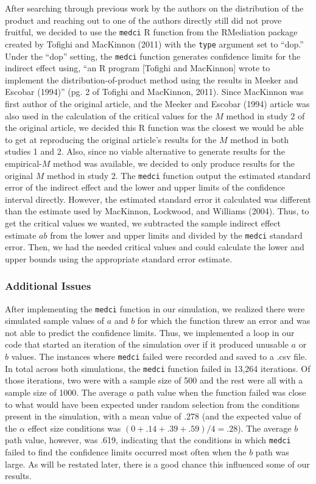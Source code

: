 \documentclass[10,a4paperpaper,]{article}
\begin{document}
After searching through previous work by the authors on the distribution
of the product and reaching out to one of the authors directly still did
not prove fruitful, we decided to use the \texttt{medci} R function from
the RMediation package created by Tofighi and MacKinnon (2011) with the
\texttt{type} argument set to ``dop.'' Under the ``dop'' setting, the
\texttt{medci} function generates confidence limits for the indirect
effect using, ``an R program {[}Tofighi and MacKinnon{]} wrote to
implement the distribution-of-product method using the results in Meeker
and Escobar (1994)'' (pg. 2 of Tofighi and MacKinnon, 2011). Since
MacKinnon was first author of the original article, and the Meeker and
Escobar (1994) article was also used in the calculation of the critical
values for the \(M\) method in study 2 of the original article, we
decided this R function was the closest we would be able to get at
reproducing the original article's results for the \(M\) method in both
studies 1 and 2. Also, since no viable alternative to generate results
for the empirical-\(M\) method was available, we decided to only produce
results for the original \(M\) method in study 2. The \texttt{medci}
function output the estimated standard error of the indirect effect and
the lower and upper limits of the confidence interval directly. However,
the estimated standard error it calculated was different than the
estimate used by MacKinnon, Lockwood, and Williams (2004). Thus, to get
the critical values we wanted, we subtracted the sample indirect effect
estimate \(ab\) from the lower and upper limits and divided by the
\texttt{medci} standard error. Then, we had the needed critical values
and could calculate the lower and upper bounds using the appropriate
standard error estimate.

\subsubsection{Additional Issues}

After implementing the \texttt{medci} function in our simulation, we
realized there were simulated sample values of \(a\) and \(b\) for which
the function threw an error and was not able to predict the confidence
limits. Thus, we implemented a loop in our code that started an
iteration of the simulation over if it produced unusable \(a\) or \(b\)
values. The instances where \texttt{medci} failed were recorded and
saved to a .csv file. In total across both simulations, the
\texttt{medci} function failed in 13,264 iterations. Of those
iterations, two were with a sample size of 500 and the rest were all
with a sample size of 1000. The average \(a\) path value when the
function failed was close to what would have been expected under random
selection from the conditions present in the simulation, with a mean
value of .278 (and the expected value of the \(\alpha\) effect size
conditions was \((0+.14+.39+.59)/4=.28\)). The average \(b\) path value,
however, was .619, indicating that the conditions in which
\texttt{medci} failed to find the confidence limits occurred most often
when the \(b\) path was large. As will be restated later, there is a
good chance this influenced some of our results.
\end{document}
